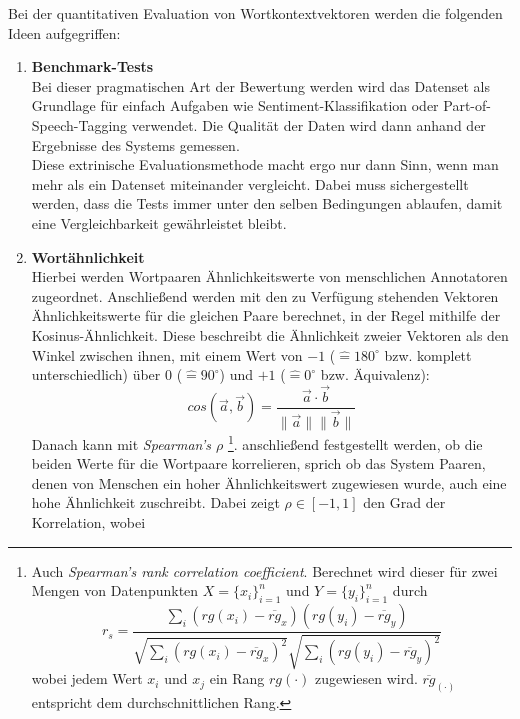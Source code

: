   Bei der quantitativen Evaluation von Wortkontextvektoren werden die folgenden Ideen aufgegriffen:\\
  \begin{enumerate}
    \item \textbf{Benchmark-Tests}\\
      Bei dieser pragmatischen Art der Bewertung werden wird das Datenset als Grundlage für
      einfach Aufgaben wie Sentiment-Klassifikation oder Part-of-Speech-Tagging verwendet.
      Die Qualität der Daten wird dann anhand der Ergebnisse des Systems gemessen.\\
      Diese extrinische Evaluationsmethode macht ergo nur dann Sinn, wenn man mehr als ein Datenset
      miteinander vergleicht. Dabei muss sichergestellt werden, dass die Tests immer unter den
      selben Bedingungen ablaufen, damit eine Vergleichbarkeit gewährleistet bleibt.\\
    \item \textbf{Wortähnlichkeit}\\
      Hierbei werden Wortpaaren Ähnlichkeitswerte von menschlichen Annotatoren zugeordnet. Anschließend
      werden mit den zu Verfügung stehenden Vektoren Ähnlichkeitswerte für die gleichen Paare berechnet,
      in der Regel mithilfe der Kosinus-Ähnlichkeit. Diese beschreibt die Ähnlichkeit zweier Vektoren
      als den Winkel zwischen ihnen, mit einem Wert von $-1$ ($\hat{=} 180^{\circ}$ bzw. komplett unterschiedlich) über 0
      ($\hat{=} 90^\circ$) und $+1$ ($\hat{=} 0^\circ$ bzw. Äquivalenz):
      \begin{equation}\label{form:cossim}
        cos(\vec{a}, \vec{b}) = \frac{\vec{a} \cdot \vec{b}}{\|\vec{a}\| \|\vec{b}\|}
      \end{equation}
      Danach kann mit \emph{Spearman's $\rho$}
      \footnote{Auch \emph{Spearman's rank correlation coefficient}.
      Berechnet wird dieser für zwei Mengen von Datenpunkten $X=\{x_i\}^n_{i=1}$ und $Y=\{y_i\}^n_{i=1}$ durch
      \[
      r_s = \frac{\sum_i(rg(x_i)-\overline{rg}_x)(rg(y_i)-\overline{rg}_y)}{\sqrt{\sum_i(rg(x_i)-\overline{rg}_x)^2} \sqrt{\sum_i(rg(y_i)-\overline{rg}_y)^2}}
      \]
      wobei jedem Wert $x_i$ und $x_j$ ein Rang $rg(\cdot)$ zugewiesen wird. $\overline{rg}_{(\cdot)}$ entspricht dem durchschnittlichen
      Rang.
      }.
      anschließend festgestellt werden, ob die beiden Werte für die Wortpaare korrelieren, sprich ob
      das System Paaren, denen von Menschen ein hoher Ähnlichkeitswert zugewiesen wurde, auch eine hohe
      Ähnlichkeit zuschreibt. Dabei zeigt $\rho \in [-1, 1]$ den Grad der Korrelation, wobei

\end{enumerate}
